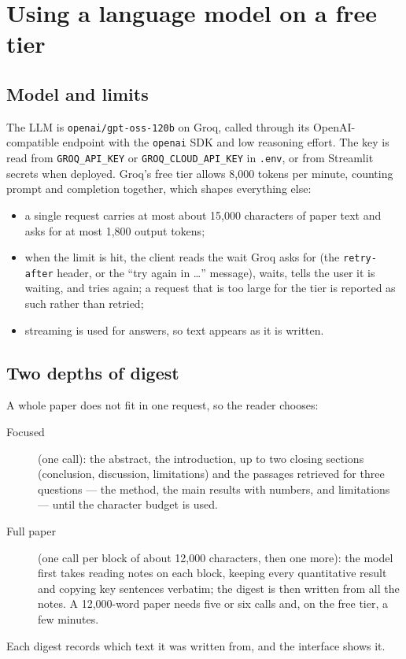 \documentclass[11pt,a4paper]{article}
\newcommand{\code}[1]{\texttt{#1}}
\begin{document}
\section{Using a language model on a free tier}

\subsection{Model and limits}
The LLM is \code{openai/gpt-oss-120b} on Groq, called through its OpenAI-compatible endpoint with the
\code{openai} SDK and low reasoning effort. The key is read from \code{GROQ\_API\_KEY} or
\code{GROQ\_CLOUD\_API\_KEY} in \code{.env}, or from Streamlit secrets when deployed. Groq's free tier allows
8,000 tokens per minute, counting prompt and completion together, which shapes everything else:
\begin{itemize}
\item a single request carries at most about 15,000 characters of paper text and asks for at most 1,800
  output tokens;
\item when the limit is hit, the client reads the wait Groq asks for (the \code{retry-after} header, or the
  ``try again in \ldots'' message), waits, tells the user it is waiting, and tries again; a request that is
  too large for the tier is reported as such rather than retried;
\item streaming is used for answers, so text appears as it is written.
\end{itemize}

\subsection{Two depths of digest}
A whole paper does not fit in one request, so the reader chooses:
\begin{description}
\item[Focused] (one call): the abstract, the introduction, up to two closing sections (conclusion,
  discussion, limitations) and the passages retrieved for three questions --- the method, the main results
  with numbers, and limitations --- until the character budget is used.
\item[Full paper] (one call per block of about 12,000 characters, then one more): the model first takes
  reading notes on each block, keeping every quantitative result and copying key sentences verbatim; the
  digest is then written from all the notes. A 12,000-word paper needs five or six calls and, on the free
  tier, a few minutes.
\end{description}
Each digest records which text it was written from, and the interface shows it.
\end{document}
